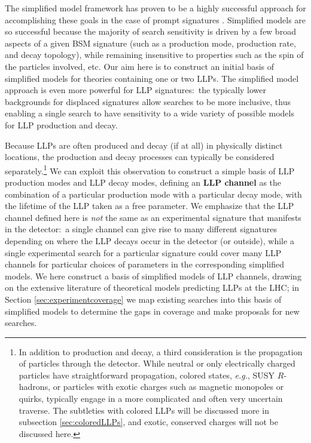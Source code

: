 
The simplified model framework has proven to be a highly successful approach for accomplishing these goals in the case of prompt signatures  \cite{Alves:2011wf}.  Simplified models are so successful because the majority of search sensitivity is driven by a few broad aspects of a given BSM signature (such as a production mode, production rate, and decay topology), while remaining insensitive to properties such as the spin of the particles involved, etc.  Our aim here is to construct an initial basis of simplified models for theories containing one or two LLPs.  The simplified model approach is even more powerful for LLP signatures:~the typically lower backgrounds for displaced signatures allow searches to be more inclusive, thus enabling a single search to have sensitivity to a wide variety of possible models for LLP production and decay.

Because LLPs are often produced and decay (if at all) in physically distinct locations, the production and decay processes can typically be  considered separately.\footnote{In addition to production and decay, a third consideration is the propagation of particles through the detector.  While neutral or only electrically charged particles have straightforward propagation, colored states, \emph{e.g.}, SUSY $R$-hadrons, or particles with exotic charges such as magnetic monopoles or quirks, typically engage in a more complicated and often very uncertain traverse.  The subtleties with colored LLPs will be discussed more in subsection \ref{sec:coloredLLPs}, and exotic, conserved charges will not be discussed here.}  
We can exploit this observation to construct a simple basis of LLP production modes and LLP decay modes, defining an {\bf LLP channel} as the combination of a particular production mode with a particular decay mode, with the lifetime of the LLP taken as a free parameter. We emphasize that the LLP channel defined here is \emph{not} the same as an experimental signature that manifests in the detector:~a single channel can give rise to many different signatures depending on where the LLP decays occur in the detector (or outside), while a single experimental search for a particular signature could cover many LLP channels for particular choices of parameters in the corresponding simplified models. We here  construct a basis of simplified models of LLP channels, drawing on the extensive  literature of theoretical models predicting LLPs at the LHC;
in Section \ref{sec:experimentcoverage} we map existing searches into this basis of simplified models to determine the gaps in coverage and make proposals for new searches.

